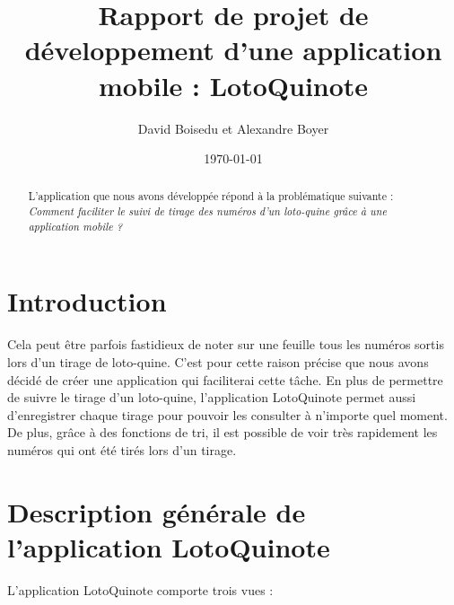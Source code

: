 \documentclass{article}
\title{Rapport de projet de développement d'une application mobile : LotoQuinote}
\author{David Boisedu et Alexandre Boyer}
\date{\today}
\begin{document}
\renewcommand{\textheight}{695pt}

\maketitle

\begin{abstract}
\begin{center}
L'application que nous avons développée répond à la problématique suivante : 
\newline \textit{Comment faciliter le suivi de tirage des numéros d'un loto-quine grâce à une application mobile ?}
\end{center}
\end{abstract}

\vspace{10em}
\renewcommand{\contentsname}{Sommaire}
\tableofcontents

\newpage

\section{Introduction}
\label{section:intro}

Cela peut être parfois fastidieux de noter sur une feuille tous les numéros sortis lors d'un tirage de loto-quine. C'est pour cette raison précise que nous avons décidé de créer une application qui faciliterai cette tâche. En plus de permettre de suivre le tirage d'un loto-quine, l'application LotoQuinote permet aussi d'enregistrer chaque tirage pour pouvoir les consulter à n'importe quel moment. De plus, grâce à des fonctions de tri, il est possible de voir très rapidement les numéros qui ont été tirés lors d'un tirage.

\section{Description générale de l'application LotoQuinote}

L'application LotoQuinote comporte trois vues :
\end{document}
